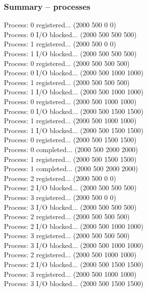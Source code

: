 \documentclass{article}
\begin{document}
\subsubsection*{Summary -- processes}
Process: 0 registered... (2000 500 0 0)\\
Process: 0 I/O blocked... (2000 500 500 500)\\
Process: 1 registered... (2000 500 0 0)\\
Process: 1 I/O blocked... (2000 500 500 500)\\
Process: 0 registered... (2000 500 500 500)\\
Process: 0 I/O blocked... (2000 500 1000 1000)\\
Process: 1 registered... (2000 500 500 500)\\
Process: 1 I/O blocked... (2000 500 1000 1000)\\
Process: 0 registered... (2000 500 1000 1000)\\
Process: 0 I/O blocked... (2000 500 1500 1500)\\
Process: 1 registered... (2000 500 1000 1000)\\
Process: 1 I/O blocked... (2000 500 1500 1500)\\
Process: 0 registered... (2000 500 1500 1500)\\
Process: 0 completed... (2000 500 2000 2000)\\
Process: 1 registered... (2000 500 1500 1500)\\
Process: 1 completed... (2000 500 2000 2000)\\
Process: 2 registered... (2000 500 0 0)\\
Process: 2 I/O blocked... (2000 500 500 500)\\
Process: 3 registered... (2000 500 0 0)\\
Process: 3 I/O blocked... (2000 500 500 500)\\
Process: 2 registered... (2000 500 500 500)\\
Process: 2 I/O blocked... (2000 500 1000 1000)\\
Process: 3 registered... (2000 500 500 500)\\
Process: 3 I/O blocked... (2000 500 1000 1000)\\
Process: 2 registered... (2000 500 1000 1000)\\
Process: 2 I/O blocked... (2000 500 1500 1500)\\
Process: 3 registered... (2000 500 1000 1000)\\
Process: 3 I/O blocked... (2000 500 1500 1500)\\
\end{document}
